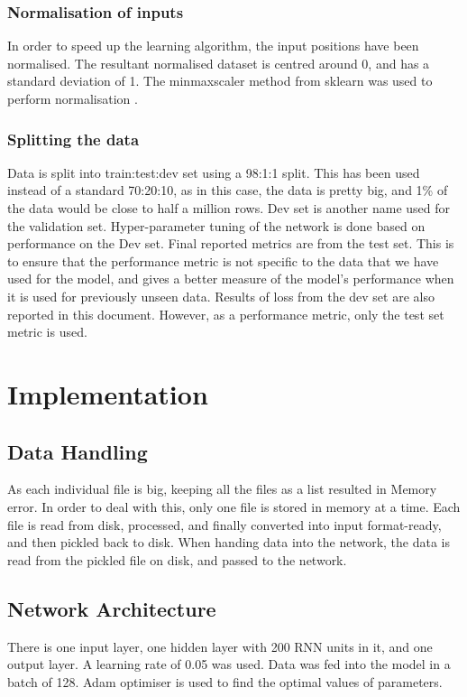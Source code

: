 \subsubsection{Normalisation of inputs}
In order to speed up the learning algorithm, the input positions have been normalised. The resultant normalised dataset is centred around 0, and has a standard deviation of 1. The minmaxscaler method from sklearn was used to perform normalisation \cite{noauthor_sklearn.preprocessing.minmaxscaler_nodate}.

\subsubsection{Splitting the data}

Data is split into train:test:dev set using a 98:1:1 split. This has been used instead of a standard 70:20:10, as in this case, the data is pretty big, and 1\% of the data would be close to half a million rows. Dev set is another name used for the validation set. Hyper-parameter tuning of the network is done based on performance on the Dev set. Final reported metrics are from the test set. This is to ensure that the performance metric is not specific to the data that we have used for the model, and gives a better measure of the model's performance when it is used for previously unseen data. Results of loss from the dev set are also reported in this document. However, as a performance metric, only the test set metric is used.

\section{Implementation}
\subsection{Data Handling}

As each individual file is big, keeping all the files as a list resulted in Memory error. In order to deal with this, only one file is stored in memory at a time. Each file is read from disk, processed, and finally converted into input format-ready, and then pickled back to disk. When handing data into the network, the data is read from the pickled file on disk, and passed to the network.

\subsection{Network Architecture}
There is one input layer, one hidden layer with 200 RNN units in it, and one output layer. A learning rate of 0.05 was used. Data was fed into the model in a batch of 128. Adam optimiser is used to find the optimal values of parameters.

